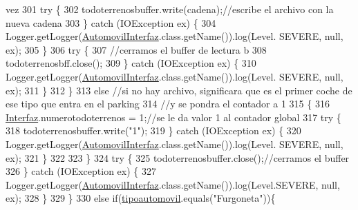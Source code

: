 \begin{DoxyCode}
{       vez}
301                     \textcolor{keywordflow}{try} \{
302                         todoterrenosbuffer.write(cadena);\textcolor{comment}{//escribe el archivo con la nueva cadena}
303                     \} \textcolor{keywordflow}{catch} (IOException ex) \{
304                         Logger.getLogger(\mbox{\hyperlink{classejercicio2_1_1_automovil_interfaz_a0ebeee030ec43693c371da3b68222644}{AutomovilInterfaz}}.class.getName()).log(Level.
      SEVERE, null, ex);
305                     \}
306                     \textcolor{keywordflow}{try} \{
307                         \textcolor{comment}{//cerramos el buffer de lectura b}
308                         todoterrenosbff.close();
309                     \} \textcolor{keywordflow}{catch} (IOException ex) \{
310                         Logger.getLogger(\mbox{\hyperlink{classejercicio2_1_1_automovil_interfaz_a0ebeee030ec43693c371da3b68222644}{AutomovilInterfaz}}.class.getName()).log(Level.
      SEVERE, null, ex);
311                     \}
312             \}
313             \textcolor{keywordflow}{else}    \textcolor{comment}{//si no hay archivo, significara que es el primer coche de ese tipo que entra en el
       parking}
314                     \textcolor{comment}{//y se pondra el contador a 1}
315             \{
316                 \mbox{\hyperlink{namespace_interfaz}{Interfaz}}.numerotodoterrenos = 1;\textcolor{comment}{//se le da valor 1 al contador global}
317                     \textcolor{keywordflow}{try} \{
318                         todoterrenosbuffer.write(\textcolor{stringliteral}{"1"});
319                     \} \textcolor{keywordflow}{catch} (IOException ex) \{
320                         Logger.getLogger(\mbox{\hyperlink{classejercicio2_1_1_automovil_interfaz_a0ebeee030ec43693c371da3b68222644}{AutomovilInterfaz}}.class.getName()).log(Level.
      SEVERE, null, ex);
321                     \}
322                 
323             \}
324                 \textcolor{keywordflow}{try} \{
325                     todoterrenosbuffer.close();\textcolor{comment}{//cerramos el buffer}
326                 \} \textcolor{keywordflow}{catch} (IOException ex) \{
327                     Logger.getLogger(\mbox{\hyperlink{classejercicio2_1_1_automovil_interfaz_a0ebeee030ec43693c371da3b68222644}{AutomovilInterfaz}}.class.getName()).log(Level.SEVERE, 
      null, ex);
328                 \}
329         \}
330         \textcolor{keywordflow}{else} \textcolor{keywordflow}{if}(\mbox{\hyperlink{classejercicio2_1_1_automovil_interfaz_ae53ea3336ded07ff47311d4e6d56cdb7}{tipoautomovil}}.equals(\textcolor{stringliteral}{"Furgoneta"}))\{

\end{DoxyCode}
